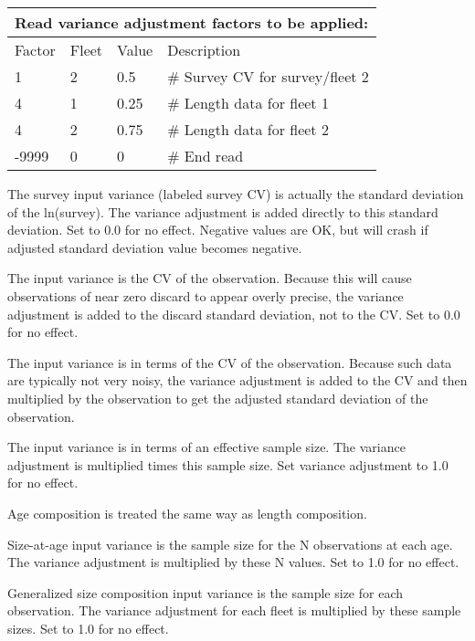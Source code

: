 \begin{longtable}{p{3cm} p{3cm} p{2.5cm} p{6.25cm} }

	\multicolumn{4}{l}{Read variance adjustment factors to be applied:}\\
	\hline
	Factor & Fleet & Value & Description \Tstrut\Bstrut\\
	\hline
	1 & 2 & 0.5 & \# Survey CV for survey/fleet 2 \Tstrut\\
	4 & 1 & 0.25 & \# Length data for fleet 1 \\
	4 & 2 & 0.75 & \# Length data for fleet 2\\
	-9999 & 0 & 0 & \# End read\Bstrut\\
	\hline
\end{longtable}


The survey input variance (labeled survey CV) is actually the standard deviation of the ln(survey). The variance adjustment is added directly to this standard deviation. Set to 0.0 for no effect. Negative values are OK, but will crash if adjusted standard deviation value becomes negative.

The input variance is the CV of the observation. Because this will cause observations of near zero discard to appear overly precise, the variance adjustment is added to the discard standard deviation, not to the CV. Set to 0.0 for no effect.

The input variance is in terms of the CV of the observation. Because such data are typically not very noisy, the variance adjustment is added to the CV and then multiplied by the observation to get the adjusted standard deviation of the observation.

The input variance is in terms of an effective sample size. The variance adjustment is multiplied times this sample size.  Set variance adjustment to 1.0 for no effect.

Age composition is treated the same way as length composition.
	
Size-at-age input variance is the sample size for the N observations at each age.  The variance adjustment is multiplied by these N values. Set to 1.0 for no effect.
	
Generalized size composition input variance is the sample size for each observation. The variance adjustment for each fleet is multiplied by these sample sizes. Set to 1.0 for no effect.
		
